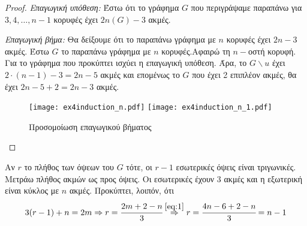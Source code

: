 \begin{solution}
\begin{proof}
 	
 	\textit{Επαγωγική υπόθεση:} Έστω ότι το γράφημα $G$ που περιγράψαμε παραπάνω  για $3,4, \ldots, n-1$ κορυφές έχει $2n(G)-3$ ακμές.
 	
 	\textit{Επαγωγική βήμα:} Θα δείξουμε ότι το παραπάνω γράφημα με $n$ κορυφές έχει $2n-3$ ακμές. Έστω $G$ το παραπάνω γράφημα με $n$ κορυφές.Αφαιρώ τη $n-$οστή κορυφή. Για το γράφημα που προκύπτει ισχύει η επαγωγική υπόθεση. Άρα, το $G\backslash u$ έχει $2\cdot (n-1)-3 = 2n-5$ ακμές και επομένως το $G$ που έχει 2 επιπλέον ακμές, θα έχει $2n-5+2=2n-3$ ακμές.
 	
 \begin{figure*}[h!]
	\texttt{[image: ex4induction\_n.pdf]}
	\texttt{[image: ex4induction\_n\_1.pdf]}
	\caption{Προσομοίωση επαγωγικού βήματος }
\end{figure*}	

  \end{proof}
  


Αν $r$ το πλήθος των όψεων του $G$ τότε, οι $r-1$ εσωτερικές όψεις είναι τριγωνικές. Μετράω πλήθος ακμών ως προς όψεις. Οι εσωτερικές έχουν 3 ακμές και η εξωτερική είναι κύκλος με $n$ ακμές. Προκύπτει, λοιπόν, ότι
		\[
			3(r-1)+n=2m \Rightarrow r = \cfrac{2m + 2 -n}{3} \overset{\eqref{eq:1}}{\Rightarrow} r = \cfrac{4n-6+2-n}{3} = n-1
		\]
\end{solution}


